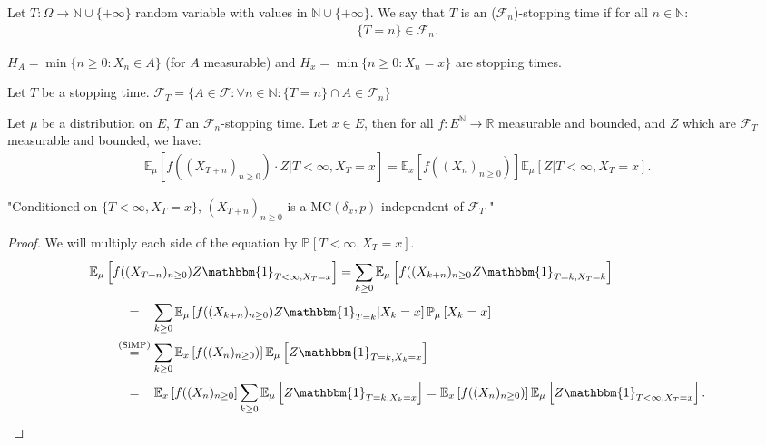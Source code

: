 \begin{defn}
	Let $T:\Omega \to \mathbb{N} \cup \{+\infty\}$ random variable with values in $\mathbb{N}\cup\{+\infty\}$. We say that $T$ is an ($ \mathcal{F}_n$)-stopping time if for all $n \in \mathbb{N}$:
	\begin{align}
		\{T=n\} \in \mathcal{F}_n
	.\end{align}
\end{defn}

\begin{ex}
	$H_{A}=\min\{n \geq 0: X_n \in  A\}$ (for $A$ measurable) and $H_x=\min\{n\geq 0: X_n = x\}$ are stopping times.
\end{ex}

\begin{defn}
	Let $T$ be a stopping time. $ \mathcal{F}_T=\{A \in \mathcal{F}: \forall n \in \mathbb{N}: \{T=n\}\cap A \in \mathcal{F}_n \}$
\end{defn}

\begin{theorem}
	Let $\mu $ be a distribution on $E$, $T$ an $ \mathcal{F}_n$-stopping time. Let $x \in E$,
	then for all $f:E^{\mathbb{N}} \to \mathbb{R}$ measurable and bounded, and $Z$ which are $ \mathcal{F}_T$ measurable and bounded, we have:
\begin{align}
	\boxed{ \mathbb{E}_{\mu } \left[ f((X_{T+n})_{n\geq 0}) \cdot Z | T<\infty, X_T=x \right] = \mathbb{E}_{x} \left[ f((X_n)_{n\geq 0}) \right]  \mathbb{E}_{\mu } \left[ Z | T<\infty, X_T=x \right]} 
.\end{align}
\end{theorem}
\noindent
"Conditioned on $\{T<\infty,X_T=x\}$, $(X_{T+n})_{n\geq 0}$ is a $ \textrm{MC}(\delta_x,p)$ independent of $ \mathcal{F}_T$ "
\begin{proof}
We will multiply each side of the equation by $\mathbb{P}_{} \left[ T < \infty, X_T =x \right]$.
\begin{align}
&	\mathbb{E}_{\mu } \left[ f((X_{T+n})_{n\geq 0})Z \mathbbm{1}_{T<\infty, X_T=x}  \right] =
		\sum_{k\geq 0}^{} \mathbb{E}_{\mu } \left[ f((X_{k+n})_{n\geq 0} Z \mathbbm{1}_{T=k, X_T=k}  \right] \\
&\qquad	\stackrel{\phantom{\text{(SiMP)}}}{=}  \sum_{k\geq 0}^{} \mathbb{E}_{\mu } \left[ f((X_{k+n})_{n\geq 0}) Z \mathbbm{1}_{T=k} | X_k = x \right] \mathbb{P}_{\mu } \left[ X_k = x  \right] \\ 
&\qquad	\stackrel{\text{(SiMP)}}{=} \sum_{k\geq 0}^{} \mathbb{E}_{x} \left[ f((X_{n})_{n\geq 0}) \right] \mathbb{E}_{\mu } \left[ Z \mathbbm{1}_{T=k, X_k = x}  \right] \\
&\qquad	\stackrel{\phantom{\text{(SiMP)}}}{=} \mathbb{E}_{x} \left[ f((X_n)_{n\geq 0} \right] \sum_{k\geq 0}^{} \mathbb{E}_{\mu } \left[ Z \mathbbm{1}_{T=k, X_k=x}  \right]  
		= \mathbb{E}_{x} \left[ f((X_n)_{n\geq 0}) \right] \mathbb{E}_{\mu } \left[ Z \mathbbm{1}_{T<\infty, X_T=x}  \right] 
.\end{align}
\end{proof}


